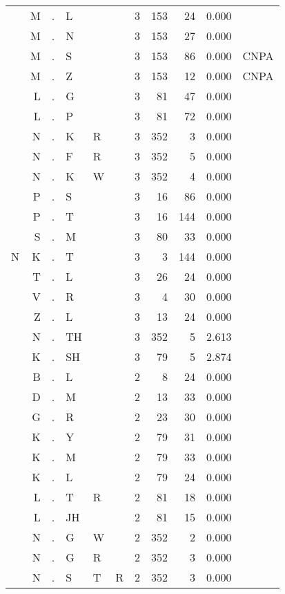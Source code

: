\begin{longtable}{r@{ } r@{ } c@{ } l@{ } l@{ } l@{ } r r r r l }
  & M & . & L &   &   & 3 & 153 & 24 & 0.000 &  \\
  & M & . & N &   &   & 3 & 153 & 27 & 0.000 &  \\
  & M & . & S &   &   & 3 & 153 & 86 & 0.000 & \textsc{CNPA} \\
  & M & . & Z &   &   & 3 & 153 & 12 & 0.000 & \textsc{CNPA} \\
  & L & . & G &   &   & 3 & 81 & 47 & 0.000 &  \\
  & L & . & P &   &   & 3 & 81 & 72 & 0.000 &  \\
  & N & . & K & R &   & 3 & 352 & 3 & 0.000 &  \\
  & N & . & F & R &   & 3 & 352 & 5 & 0.000 &  \\
  & N & . & K & W &   & 3 & 352 & 4 & 0.000 &  \\
  & P & . & S &   &   & 3 & 16 & 86 & 0.000 &  \\
  & P & . & T &   &   & 3 & 16 & 144 & 0.000 &  \\
  & S & . & M &   &   & 3 & 80 & 33 & 0.000 &  \\
N & K & . & T &   &   & 3 & 3 & 144 & 0.000 &  \\
  & T & . & L &   &   & 3 & 26 & 24 & 0.000 &  \\
  & V & . & R &   &   & 3 & 4 & 30 & 0.000 &  \\
  & Z & . & L &   &   & 3 & 13 & 24 & 0.000 &  \\
  & N & . & TH &   &   & 3 & 352 & 5 & 2.613 &  \\
  & K & . & SH &   &   & 3 & 79 & 5 & 2.874 &  \\
  & B & . & L &   &   & 2 & 8 & 24 & 0.000 &  \\
  & D & . & M &   &   & 2 & 13 & 33 & 0.000 &  \\
  & G & . & R &   &   & 2 & 23 & 30 & 0.000 &  \\
  & K & . & Y &   &   & 2 & 79 & 31 & 0.000 &  \\
  & K & . & M &   &   & 2 & 79 & 33 & 0.000 &  \\
  & K & . & L &   &   & 2 & 79 & 24 & 0.000 &  \\
  & L & . & T & R &   & 2 & 81 & 18 & 0.000 &  \\
  & L & . & JH &   &   & 2 & 81 & 15 & 0.000 &  \\
  & N & . & G & W &   & 2 & 352 & 2 & 0.000 &  \\
  & N & . & G & R &   & 2 & 352 & 3 & 0.000 &  \\
  & N & . & S & T & R & 2 & 352 & 3 & 0.000 &  \\

\end{longtable}
